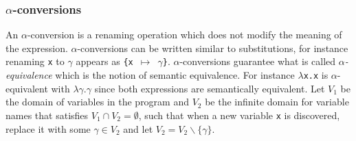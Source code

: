\subsubsection{$\alpha$-conversions} \label{sec:alpha}
An $\alpha$-conversion is a renaming operation which does not modify the meaning of the expression.
$\alpha$-conversions can be written similar to substitutions, for instance renaming \texttt{x} to $\gamma$ appears as \texttt{\{x $\mapsto$ $\gamma$\}}.
$\alpha$-conversions guarantee what is called \textit{$\alpha$-equivalence} which is the notion of semantic equivalence.
For instance \texttt{$\lambda$x.x} is $\alpha$-equivalent with \texttt{$\lambda\gamma.\gamma$} since both expressions are semantically equivalent.
Let $V_1$ be the domain of variables in the program and $V_2$ be the infinite domain for variable names that satisfies $V_1 \cap V_2 = \emptyset$, such that when a new variable \texttt{x} is discovered, replace it with some $\gamma \in V_2$ and let $V_2 = V_2 \backslash \{\gamma\}$.
